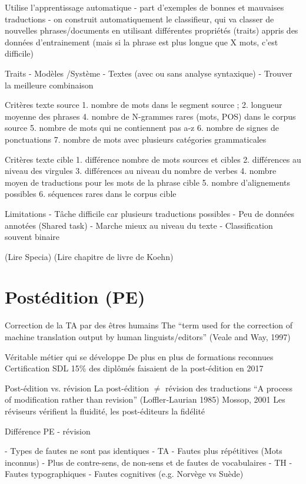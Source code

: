 Utilise l’apprentissage automatique
    - part d’exemples de bonnes et mauvaises traductions
    - on construit automatiquement le classifieur, qui va classer de nouvelles phrases/documents en utilisant différentes propriétés (traits)  appris des données d’entrainement (mais si la phrase est plus longue que X mots, c’est difficile)

Traits
    - Modèles /Système
    - Textes (avec ou sans analyse syntaxique)
    - Trouver la meilleure combinaison

Critères texte source
1. nombre de mots dans le segment source ;
2. longueur moyenne des phrases
4. nombre de N-grammes rares (mots, POS) dans le corpus source
5. nombre de mots qui ne contiennent pas a-z
6. nombre de signes de ponctuations
7. nombre de mots avec plusieurs catégories grammaticales

Critères texte cible
1. différence nombre de mots sources et cibles
2. différences au niveau des virgules
3. différences au niveau du nombre de verbes
4. nombre moyen de traductions pour les mots de la phrase cible
5. nombre d’alignements possibles
6. séquences rares dans le corpus cible

Limitations
- Tâche difficile car plusieurs traductions possibles
- Peu de données annotées (Shared task)
- Marche mieux au niveau du texte
- Classification souvent binaire

(Lire Specia)
(Lire chapitre de livre de Koehn)

\section{Postédition (PE)}

Correction de la TA par des êtres humains
The “term used for the correction of machine translation output by human linguists/editors” (Veale and Way, 1997)

Véritable métier qui se développe
De plus en plus de formations reconnues
Certification SDL
15\% des diplômés faisaient de la post-édition en 2017

Post-édition vs. révision
La post-édition $\neq$ révision des traductions
“A process of modification rather than revision” (Loffler‐Laurian 1985)
Mossop, 2001
Les réviseurs vérifient la fluidité, les post-éditeurs la fidélité

Différence PE - révision

- Types de fautes ne sont pas identiques
    - TA
        - Fautes plus répétitives (Mots inconnus)
        - Plus de contre-sens, de non-sens et de fautes de vocabulaires
    - TH
        - Fautes typographiques
        - Fautes cognitives (e.g. Norvège vs Suède)

